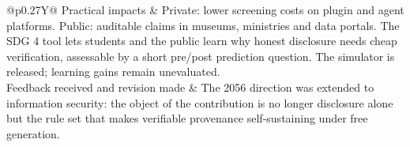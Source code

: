 \begin{table}[H]
\begin{tabularx}{\textwidth}{@{}p{}Y@{}}
Practical impacts & Private: lower screening costs on plugin and agent platforms. Public: auditable claims in museums, ministries and data portals. The SDG 4 tool lets students and the public learn why honest disclosure needs cheap verification, assessable by a short pre/post prediction question. The simulator is released; learning gains remain unevaluated. \\
Feedback received and revision made & The 2056 direction was extended to information security: the object of the contribution is no longer disclosure alone but the rule set that makes verifiable provenance self-sustaining under free generation. \\
\bottomrule
\end{tabularx}
\end{table}
